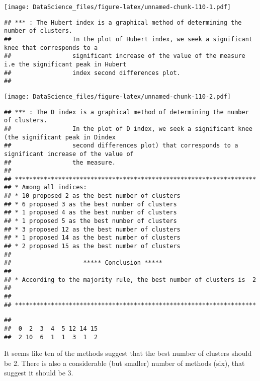 \documentclass[
]{book}
\newenvironment{Shaded}{\begin{snugshade}}{\end{snugshade}}
\newcommand{\DecValTok}[1]{\textcolor[rgb]{0.00,0.00,0.81}{#1}}
\newcommand{\FunctionTok}[1]{\textcolor[rgb]{0.00,0.00,0.00}{#1}}
\newcommand{\NormalTok}[1]{#1}
\newcommand{\SpecialCharTok}[1]{\textcolor[rgb]{0.00,0.00,0.00}{#1}}
\begin{document}
\texttt{[image: DataScience\_files/figure-latex/unnamed-chunk-110-1.pdf]}

\begin{verbatim}
## *** : The Hubert index is a graphical method of determining the number of clusters.
##                 In the plot of Hubert index, we seek a significant knee that corresponds to a 
##                 significant increase of the value of the measure i.e the significant peak in Hubert
##                 index second differences plot. 
## 
\end{verbatim}

\texttt{[image: DataScience\_files/figure-latex/unnamed-chunk-110-2.pdf]}

\begin{verbatim}
## *** : The D index is a graphical method of determining the number of clusters. 
##                 In the plot of D index, we seek a significant knee (the significant peak in Dindex
##                 second differences plot) that corresponds to a significant increase of the value of
##                 the measure. 
##  
## ******************************************************************* 
## * Among all indices:                                                
## * 10 proposed 2 as the best number of clusters 
## * 6 proposed 3 as the best number of clusters 
## * 1 proposed 4 as the best number of clusters 
## * 1 proposed 5 as the best number of clusters 
## * 3 proposed 12 as the best number of clusters 
## * 1 proposed 14 as the best number of clusters 
## * 2 proposed 15 as the best number of clusters 
## 
##                    ***** Conclusion *****                            
##  
## * According to the majority rule, the best number of clusters is  2 
##  
##  
## *******************************************************************
\end{verbatim}

\begin{Shaded}
\end{Shaded}

\begin{verbatim}
## 
##  0  2  3  4  5 12 14 15 
##  2 10  6  1  1  3  1  2
\end{verbatim}

It seems like ten of the methods suggest that the best number of clusters should be 2. There is also a considerable (but smaller) number of methods (six), that suggest it should be 3.
\end{document}

